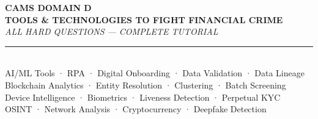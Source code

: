 \documentclass[12pt,aspectratio=169]{beamer}
\begin{document}
	
	\begin{frame}
		\centering
		\vspace{0.3cm}
		{\fontsize{18}{22}\selectfont \textbf{CAMS DOMAIN D}}\\[0.1cm]
		{\fontsize{14}{17}\selectfont \textbf{TOOLS \& TECHNOLOGIES TO FIGHT FINANCIAL CRIME}}\\[0.15cm]
		{\fontsize{9}{11}\selectfont \textit{ALL HARD QUESTIONS — COMPLETE TUTORIAL}}\\[0.08cm]
		\rule{4cm}{0.5pt}\\[0.08cm]
		{\fontsize{6}{7}\selectfont AI/ML Tools · RPA · Digital Onboarding · Data Validation · Data Lineage}\\[0.04cm]
		{\fontsize{6}{7}\selectfont Blockchain Analytics · Entity Resolution · Clustering · Batch Screening}\\[0.04cm]
		{\fontsize{6}{7}\selectfont Device Intelligence · Biometrics · Liveness Detection · Perpetual KYC}\\[0.04cm]
		{\fontsize{6}{7}\selectfont OSINT · Network Analysis · Cryptocurrency · Deepfake Detection}
		\vspace{0.2cm}
	\end{frame}
	
\end{document}
